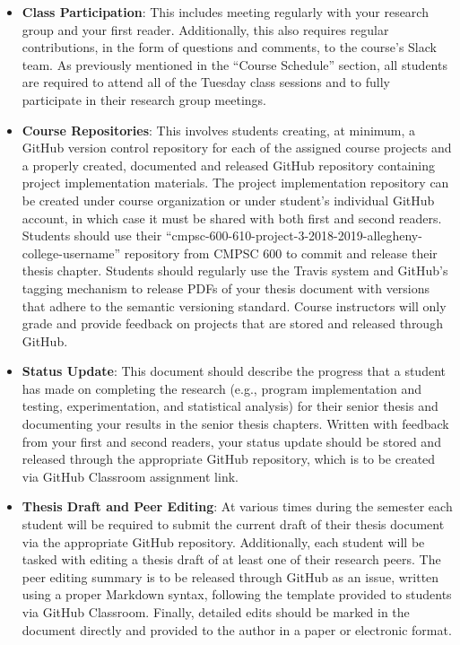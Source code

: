 \documentclass[11pt]{article}
\begin{document}
\begin{itemize}

  \item {\bf Class Participation}: This includes meeting regularly with your
    research group and your first reader. Additionally, this also requires regular
    contributions, in the form of questions and comments, to the course's Slack
    team. As previously mentioned in the ``Course Schedule'' section, all
    students are required to attend all of the Tuesday class sessions and to
    fully participate in their research group meetings.

  \item {\bf Course Repositories}: This involves students creating, at minimum,
    a GitHub version control repository for each of the assigned course
    projects and a properly created, documented and released GitHub repository
    containing project implementation materials. The project implementation
    repository can be created under course organization or under student's individual
    GitHub account, in which case it must be shared with both first and second readers. 
    Students should use their
    ``cmpsc-600-610-project-3-2018-2019-allegheny-college-username'' 
    repository from CMPSC 600 to commit and release their thesis chapter. 
    Students should regularly use the Travis system and GitHub's tagging mechanism
    to release PDFs of your thesis document with versions that adhere to the semantic
    versioning standard. Course instructors will only grade and provide feedback
    on projects that are stored and released through GitHub.

  \item {\bf Status Update}: This document should describe the progress that a
    student has made on completing the research (e.g., program implementation
    and testing, experimentation, and statistical analysis) for their senior
    thesis and documenting your results in the senior thesis chapters. Written
    with feedback from your first and second readers, your status update should
    be stored and released through the appropriate GitHub repository, which is to be
    created via GitHub Classroom assignment link.
    
   \item {\bf Thesis Draft and Peer Editing}: At various times during the semester 
   each student will be required to submit the current draft of their thesis document
   via the appropriate GitHub repository. Additionally, each student will be tasked with editing a thesis
   draft of at least one of their research peers. The peer editing summary is to be
   released through GitHub as an issue, written using a proper Markdown syntax, 
   following the template provided to students via GitHub Classroom. 
   Finally, detailed edits should be marked in the document directly and provided to the author 
   in a paper or electronic format.


\end{itemize}
\end{document}
